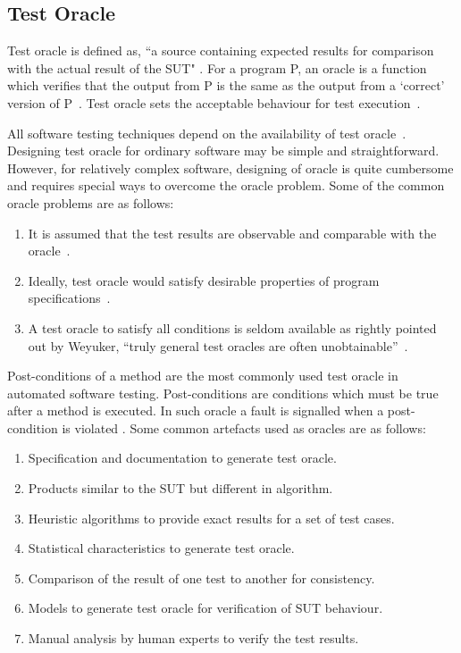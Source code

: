 \subsection{Test Oracle}
Test oracle is defined as, ``a source containing expected results for comparison with the actual result of the SUT" \cite{ahmed2010software}. For a program P, an oracle is a function which verifies that the output from P is the same as the output from a ‘correct’ version of P~\cite{howden1986functional}. Test oracle sets the acceptable behaviour for test execution~\cite{baresi2001test}. 

All software testing techniques depend on the availability of test oracle~\cite{gaudel2010software}. Designing test oracle for ordinary software may be simple and straightforward. However, for relatively complex software, designing of oracle is quite cumbersome and requires special ways to overcome the oracle problem. Some of the common oracle problems are as follows:

\begin{enumerate}
\item It is assumed that the test results are observable and comparable with the oracle~\cite{weyuker1982testing}.
\item Ideally, test oracle would satisfy desirable properties of program specifications~\cite{baresi2001test}.
\item A test oracle to satisfy all conditions is seldom available as rightly pointed out by Weyuker, ``truly general test oracles are often unobtainable''~\cite{weyuker1982testing}. 
\end{enumerate}
\bigskip
Post-conditions of a method are the most commonly used test oracle in automated software testing. Post-conditions are conditions which must be true after a method is executed. In such oracle a fault is signalled when a post-condition is violated \cite{meyer2009programs}. Some common artefacts used as oracles are as follows:

\begin{enumerate}
\item Specification and documentation to generate test oracle. 
\item Products similar to the SUT but different in algorithm. %
\item Heuristic algorithms to provide exact results for a set of test cases. %
\item Statistical characteristics to generate test oracle. %
\item Comparison of the result of one test to another for consistency. %
\item Models to generate test oracle for verification of SUT behaviour. %
\item Manual analysis by human experts to verify the test results. %
\end{enumerate}

